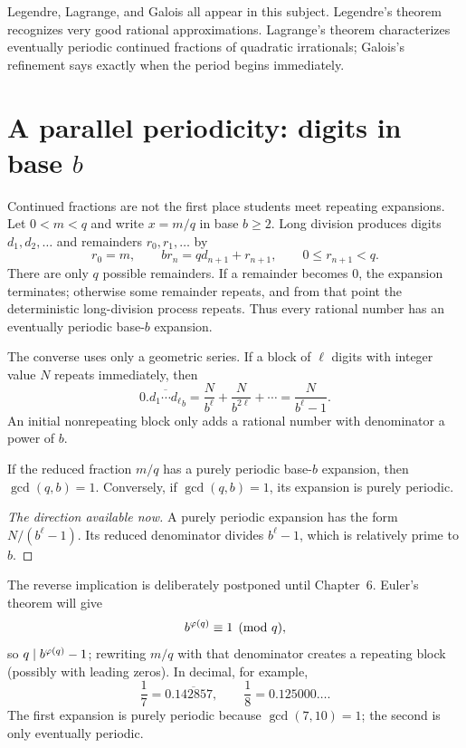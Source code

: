 \begin{warningbox}[breakable=false]
Legendre, Lagrange, and Galois all appear in this subject. Legendre's theorem
recognizes very good rational approximations. Lagrange's theorem characterizes
eventually periodic continued fractions of quadratic irrationals; Galois's
refinement says exactly when the period begins immediately.
\end{warningbox}

\section{A parallel periodicity: digits in base \texorpdfstring{$b$}{b}}

Continued fractions are not the first place students meet repeating expansions.
Let $0<m<q$ and write $x=m/q$ in base $b\ge2$. Long division produces digits
$d_1,d_2,\dots$ and remainders $r_0,r_1,\dots$ by
\[
  r_0=m,\qquad br_n=qd_{n+1}+r_{n+1},\qquad 0\le r_{n+1}<q.
\]
There are only $q$ possible remainders. If a remainder becomes $0$, the
expansion terminates; otherwise some remainder repeats, and from that point
the deterministic long-division process repeats. Thus every rational number
has an eventually periodic base-$b$ expansion.

The converse uses only a geometric series. If a block of $\ell$ digits with
integer value $N$ repeats immediately, then
\[
  0.\overline{d_1\cdots d_\ell}_b
  =\frac{N}{b^\ell}+\frac{N}{b^{2\ell}}+\cdots
  =\frac{N}{b^\ell-1}.
\]
An initial nonrepeating block only adds a rational number with denominator a
power of $b$.

\begin{theorem}
If the reduced fraction $m/q$ has a purely periodic base-$b$ expansion, then
$\gcd(q,b)=1$. Conversely, if $\gcd(q,b)=1$, its expansion is purely periodic.
\end{theorem}

\begin{proof}[The direction available now]
A purely periodic expansion has the form $N/(b^\ell-1)$. Its reduced
denominator divides $b^\ell-1$, which is relatively prime to $b$.
\end{proof}

The reverse implication is deliberately postponed until Chapter~6. Euler's
theorem will give
\[
  b^{\varphi(q)}\equiv1\pmod q,
\]
so $q\mid b^{\varphi(q)}-1$; rewriting $m/q$ with that denominator creates
a repeating block (possibly with leading zeros). In decimal, for example,
\[
  \frac17=0.\overline{142857},\qquad
  \frac18=0.125000\dots.
\]
The first expansion is purely periodic because $\gcd(7,10)=1$; the second is
only eventually periodic.

